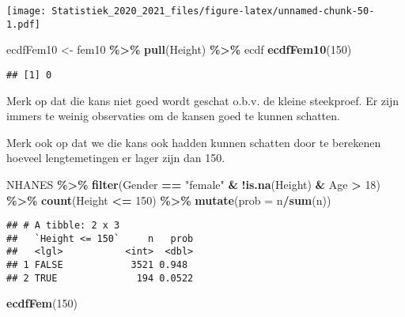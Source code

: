 \documentclass[
  12pt,dutch,coursenotes]{book}
\newenvironment{Shaded}{\begin{snugshade}}{\end{snugshade}}
\newcommand{\DataTypeTok}[1]{\textcolor[rgb]{0.13,0.29,0.53}{#1}}
\newcommand{\DecValTok}[1]{\textcolor[rgb]{0.00,0.00,0.81}{#1}}
\newcommand{\KeywordTok}[1]{\textcolor[rgb]{0.13,0.29,0.53}{\textbf{#1}}}
\newcommand{\NormalTok}[1]{#1}
\newcommand{\OperatorTok}[1]{\textcolor[rgb]{0.81,0.36,0.00}{\textbf{#1}}}
\newcommand{\StringTok}[1]{\textcolor[rgb]{0.31,0.60,0.02}{#1}}
\theoremstyle{definition}
\theoremstyle{definition}
\theoremstyle{definition}
\theoremstyle{remark}
\begin{document}
\texttt{[image: Statistiek\_2020\_2021\_files/figure-latex/unnamed-chunk-50-1.pdf]}

\begin{Shaded}
\begin{Highlighting}[]
\NormalTok{ecdfFem10 \textless{}{-}}\StringTok{ }\NormalTok{fem10 }\OperatorTok{\%\textgreater{}\%}\StringTok{ }\KeywordTok{pull}\NormalTok{(Height) }\OperatorTok{\%\textgreater{}\%}\StringTok{ }\NormalTok{ecdf}
\KeywordTok{ecdfFem10}\NormalTok{(}\DecValTok{150}\NormalTok{)}
\end{Highlighting}
\end{Shaded}

\begin{verbatim}
## [1] 0
\end{verbatim}

Merk op dat die kans niet goed wordt geschat o.b.v. de kleine steekproef. Er zijn immers te weinig observaties om de kansen goed te kunnen schatten.

Merk ook op dat we die kans ook hadden kunnen schatten door te berekenen hoeveel lengtemetingen er lager zijn dan 150.

\begin{Shaded}
\begin{Highlighting}[]
\NormalTok{NHANES }\OperatorTok{\%\textgreater{}\%}\StringTok{ }\KeywordTok{filter}\NormalTok{(Gender }\OperatorTok{==}\StringTok{ "female"} \OperatorTok{\&}\StringTok{ }\OperatorTok{!}\KeywordTok{is.na}\NormalTok{(Height) }\OperatorTok{\&}\StringTok{ }
\StringTok{    }\NormalTok{Age }\OperatorTok{\textgreater{}}\StringTok{ }\DecValTok{18}\NormalTok{) }\OperatorTok{\%\textgreater{}\%}\StringTok{ }\KeywordTok{count}\NormalTok{(Height }\OperatorTok{\textless{}=}\StringTok{ }\DecValTok{150}\NormalTok{) }\OperatorTok{\%\textgreater{}\%}\StringTok{ }\KeywordTok{mutate}\NormalTok{(}\DataTypeTok{prob =}\NormalTok{ n}\OperatorTok{/}\KeywordTok{sum}\NormalTok{(n))}
\end{Highlighting}
\end{Shaded}

\begin{verbatim}
## # A tibble: 2 x 3
##   `Height <= 150`     n   prob
##   <lgl>           <int>  <dbl>
## 1 FALSE            3521 0.948 
## 2 TRUE              194 0.0522
\end{verbatim}

\begin{Shaded}
\begin{Highlighting}[]
\KeywordTok{ecdfFem}\NormalTok{(}\DecValTok{150}\NormalTok{)}
\end{Highlighting}
\end{Shaded}
\end{document}
